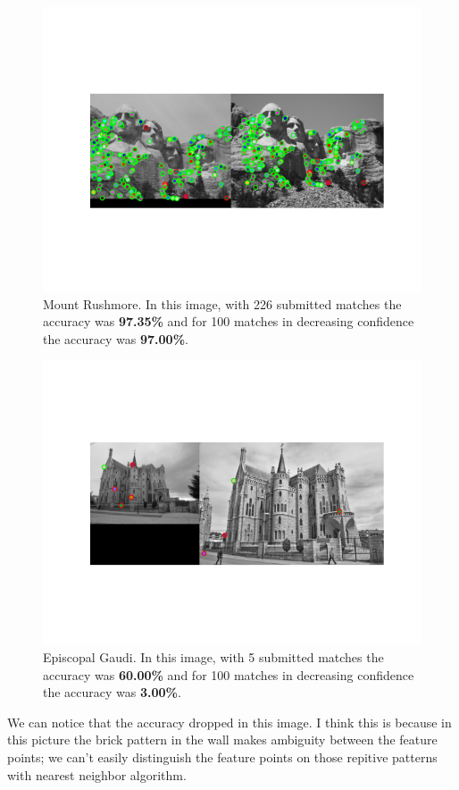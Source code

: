     \begin{figure}[htb!]
        \centering
        \includegraphics[width=15cm]{../eval_MR.png}
        \caption{Mount Rushmore. In this image, with 226 submitted matches the accuracy was \textbf{97.35\%} and for 100 matches in decreasing confidence the accuracy was \textbf{97.00\%}.}
        \label{fig:result2}
    \end{figure}
\clearpage    
    \begin{figure}[htb!]
        \centering
        \includegraphics[width=15cm]{../eval_EG.png}
        \caption{Episcopal Gaudi. In this image, with 5 submitted matches the accuracy was \textbf{60.00\%} and for 100 matches in decreasing confidence the accuracy was \textbf{3.00\%}.}
        \label{fig:result3}
    \end{figure}
    We can notice that the accuracy dropped in this image. I think this is because in this picture the brick pattern in the wall makes ambiguity between the feature points; we can't easily distinguish the feature points on those repitive patterns with nearest neighbor algorithm.
\clearpage
